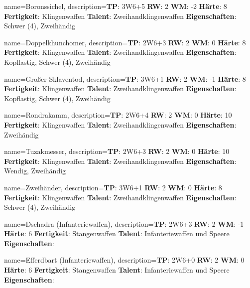 {
    name={Boronssichel},
    description={\textbf{TP}: 3W6+5 \textbf{RW}: 2 \textbf{WM}: -2 \textbf{Härte}: 8        \textbf{Fertigkeit}: Klingenwaffen \textbf{Talent}: Zweihandklingenwaffen \textbf{{Eigenschaften}}: Schwer (4), Zweihändig}
}



{
    name={Doppelkhunchomer},
    description={\textbf{TP}: 2W6+3 \textbf{RW}: 2 \textbf{WM}: 0 \textbf{Härte}: 8        \textbf{Fertigkeit}: Klingenwaffen \textbf{Talent}: Zweihandklingenwaffen \textbf{{Eigenschaften}}: Kopflastig, Schwer (4), Zweihändig}
}



{
    name={Großer Sklaventod},
    description={\textbf{TP}: 3W6+1 \textbf{RW}: 2 \textbf{WM}: -1 \textbf{Härte}: 8        \textbf{Fertigkeit}: Klingenwaffen \textbf{Talent}: Zweihandklingenwaffen \textbf{{Eigenschaften}}: Kopflastig, Schwer (4), Zweihändig}
}



{
    name={Rondrakamm},
    description={\textbf{TP}: 2W6+4 \textbf{RW}: 2 \textbf{WM}: 0 \textbf{Härte}: 10        \textbf{Fertigkeit}: Klingenwaffen \textbf{Talent}: Zweihandklingenwaffen \textbf{{Eigenschaften}}: Zweihändig}
}



{
    name={Tuzakmesser},
    description={\textbf{TP}: 2W6+3 \textbf{RW}: 2 \textbf{WM}: 0 \textbf{Härte}: 10        \textbf{Fertigkeit}: Klingenwaffen \textbf{Talent}: Zweihandklingenwaffen \textbf{{Eigenschaften}}: Wendig, Zweihändig}
}



{
    name={Zweihänder},
    description={\textbf{TP}: 3W6+1 \textbf{RW}: 2 \textbf{WM}: 0 \textbf{Härte}: 8        \textbf{Fertigkeit}: Klingenwaffen \textbf{Talent}: Zweihandklingenwaffen \textbf{{Eigenschaften}}: Schwer (4), Zweihändig}
}



{
    name={Dschadra (Infanteriewaffen)},
    description={\textbf{TP}: 2W6+3 \textbf{RW}: 2 \textbf{WM}: -1 \textbf{Härte}: 6        \textbf{Fertigkeit}: Stangenwaffen \textbf{Talent}: Infanteriewaffen und Speere \textbf{{Eigenschaften}}: }
}



{
    name={Efferdbart (Infanteriewaffen)},
    description={\textbf{TP}: 2W6+0 \textbf{RW}: 2 \textbf{WM}: 0 \textbf{Härte}: 6        \textbf{Fertigkeit}: Stangenwaffen \textbf{Talent}: Infanteriewaffen und Speere \textbf{{Eigenschaften}}: }
}



